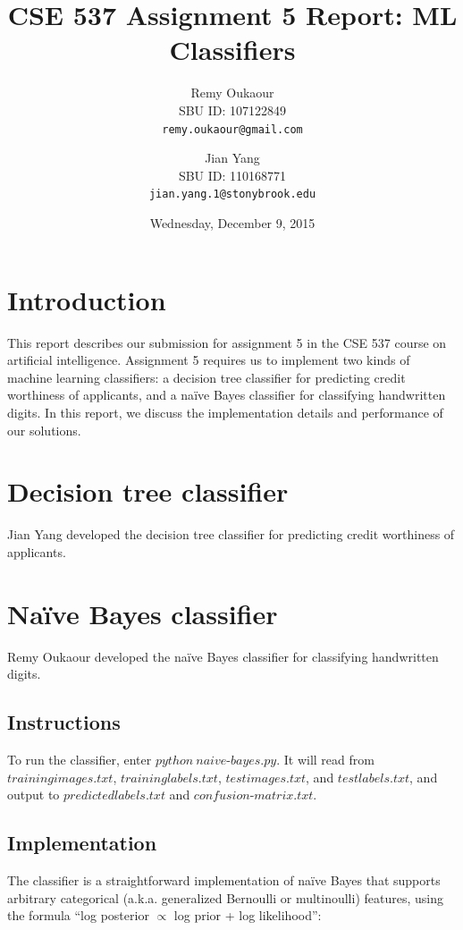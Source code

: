 \documentclass[11pt]{article}
\title{CSE 537 Assignment 5 Report: ML Classifiers}
\author{
Remy Oukaour \\
	{\small SBU ID: 107122849}\\
	{\small \texttt{remy.oukaour@gmail.com}}
\and
Jian Yang \\
	{\small SBU ID: 110168771}\\
	{\small \texttt{jian.yang.1@stonybrook.edu}}
}
\date{Wednesday, December 9, 2015}
\begin{document}
\maketitle

\section{Introduction}

This report describes our submission for assignment 5 in the CSE 537 course on
artificial intelligence. Assignment 5 requires us to implement two kinds of
machine learning classifiers: a decision tree classifier for predicting credit
worthiness of applicants, and a na{\"i}ve Bayes classifier for classifying
handwritten digits. In this report, we discuss the implementation details and
performance of our solutions.

\section{Decision tree classifier}

Jian Yang developed the decision tree classifier for predicting credit worthiness
of applicants.


\section{Na{\"i}ve Bayes classifier}

Remy Oukaour developed the na{\"i}ve Bayes classifier for classifying handwritten
digits.

\subsection{Instructions}

To run the classifier, enter $python\ naive\text{-}bayes.py$. It will read from
$trainingimages.txt$, $traininglabels.txt$, $testimages.txt$, and $testlabels.txt$,
and output to $predictedlabels.txt$ and $confusion\text{-}matrix.txt$.

\subsection{Implementation}

The classifier is a straightforward implementation of na{\"i}ve Bayes that supports
arbitrary categorical (a.k.a. generalized Bernoulli or multinoulli) features, using
the formula ``log posterior $\propto$ log prior + log likelihood'':
\end{document}
